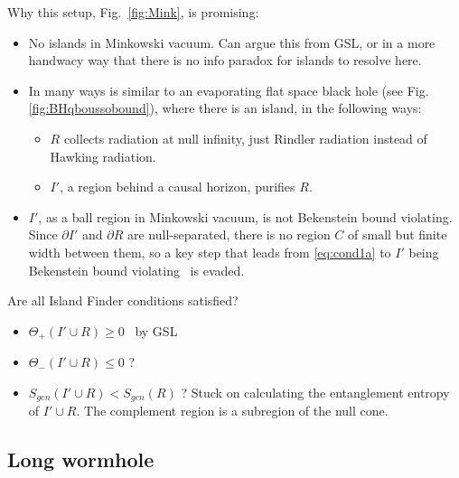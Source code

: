 \documentclass[a4paper,11pt]{article}
\newcommand{\del}{\partial}
\begin{document}
\noindent Why this setup, Fig.~\ref{fig:Mink}, is promising:
\begin{itemize}
\item No islands in Minkowski vacuum. Can argue this from GSL, or in a more handwacy way that there is no info paradox for islands to resolve here. 
\item In many ways is similar to an evaporating flat space black hole (see Fig. \ref{fig:BHqboussobound}), where there is an island, in the following ways: 
\begin{itemize}
\item $R$ collects radiation at null infinity, just Rindler radiation instead of Hawking radiation.
\item $I'$, a region behind a causal horizon, purifies $R$.
\end{itemize}
\item $I'$, as a ball region in Minkowski vacuum, is not Bekenstein bound violating. Since $\del I'$ and $\del R$ are null-separated, there is no region $C$ of small but finite width between them, so a key step that leads from \eqref{eq:cond1a} to $I'$ being Bekenstein bound violating~\cite{Hartman2020} is evaded. 
\end{itemize}
Are all Island Finder conditions satisfied?
\begin{itemize}
\item $\Theta_+ (I' \cup R) \geq 0$ \checkmark \, by GSL
\item $\Theta_- (I' \cup R) \leq 0$ ?
\item $S_{gen}(I' \cup R) < S_{gen} (R)$ ? Stuck on calculating the entanglement entropy of $I' \cup R$. The complement region is a subregion of the null cone.
\end{itemize} 
\fi

\iffalse
\subsection{Long wormhole}\label{sec:LongWormhole}

\end{document}
